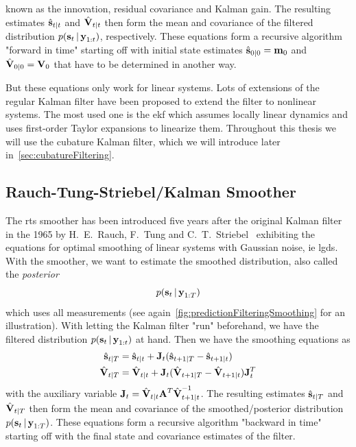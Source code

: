 		known as the innovation, residual covariance and Kalman gain. The resulting estimates \( \hat{\boldsymbol{\mathrm{s}}}_{t \vert t} \) and \( \hat{\boldsymbol{\mathrm{V}}}_{t \vert t} \) then form the mean and covariance of the filtered distribution \( p(\boldsymbol{\mathrm{s}}_t \,\vert\, \boldsymbol{\mathrm{y}}_{1:t}) \), respectively. These equations form a recursive algorithm "forward in time" starting off with initial state estimates \( \hat{\boldsymbol{\mathrm{s}}}_{0 \vert 0} = \boldsymbol{\mathrm{m}}_0 \) and \( \hat{\boldsymbol{\mathrm{V}}}_{0 \vert 0} = \boldsymbol{\mathrm{V}}_0 \) that have to be determined in another way.

		But these equations only work for linear systems. Lots of extensions of the regular Kalman filter have been proposed to extend the filter to nonlinear systems. The most used one is the \ac{ekf} which assumes locally linear dynamics and uses first-order Taylor expansions to linearize them. Throughout this thesis we will use the cubature Kalman filter, which we will introduce later in~\autoref{sec:cubatureFiltering}.

	\subsection{Rauch-Tung-Striebel/Kalman Smoother}
		The \ac{rts} smoother has been introduced five years after the original Kalman filter in the 1965 by H.~E.~Rauch, F.~Tung and C.~T.~Striebel~\cite{rauchMaximumLikelihoodEstimates1965} exhibiting the equations for optimal smoothing of linear systems with Gaussian noise, \ac{ie} \ac{lgds}. With the smoother, we want to estimate the smoothed distribution, also called the \emph{posterior}
		\begin{equation*}
			p(\boldsymbol{\mathrm{s}}_t \,\vert\, \boldsymbol{\mathrm{y}}_{1:T})
		\end{equation*}
		which uses all measurements (see again~\autoref{fig:predictionFilteringSmoothing} for an illustration). With letting the Kalman filter "run" beforehand, we have the filtered distribution \( p(\boldsymbol{\mathrm{s}}_t \,\vert\, \boldsymbol{\mathrm{y}}_{1:t}) \) at hand. Then we have the smoothing equations as
		\begin{align}
			\hat{\boldsymbol{\mathrm{s}}}_{t \vert T} &= \hat{\boldsymbol{\mathrm{s}}}_{t \vert t} + \boldsymbol{\mathrm{J}}_t (\hat{\boldsymbol{\mathrm{s}}}_{t + 1 \vert T} - \hat{\boldsymbol{\mathrm{s}}}_{t + 1 \vert t})  \label{eqn:rtsState} \\
			\hat{\boldsymbol{\mathrm{V}}}_{t \vert T} &= \hat{\boldsymbol{\mathrm{V}}}_{t \vert t} + \boldsymbol{\mathrm{J}}_t (\hat{\boldsymbol{\mathrm{V}}}_{t + 1 \vert T} - \hat{\boldsymbol{\mathrm{V}}}_{t + 1 \vert t}) \boldsymbol{\mathrm{J}}_t^T  \label{eqn:rtsCov}
		\end{align}
		with the auxiliary variable \( \boldsymbol{\mathrm{J}}_t = \hat{\boldsymbol{\mathrm{V}}}_{t \vert t} \boldsymbol{\mathrm{A}}^T \hat{\boldsymbol{\mathrm{V}}}_{t + 1 \vert t}^{-1} \). The resulting estimates \( \hat{\boldsymbol{\mathrm{s}}}_{t \vert T} \) and \( \hat{\boldsymbol{\mathrm{V}}}_{t \vert T} \) then form the mean and covariance of the smoothed/posterior distribution \( p(\boldsymbol{\mathrm{s}}_t \,\vert\, \boldsymbol{\mathrm{y}}_{1:T}) \). These equations form a recursive algorithm "backward in time" starting off with the final state and covariance estimates of the filter.

